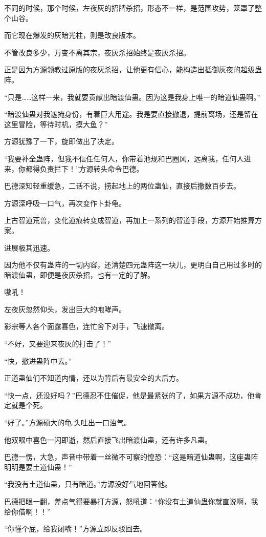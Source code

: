 \begin{this_body}
不同的时候，那个时候，左夜灰的招牌杀招，形态不一样，是范围攻势，笼罩了整个山谷。

而它现在爆发的灰暗光柱，则是改良版本。

不管改良多少，万变不离其宗，夜灰杀招始终是夜灰杀招。

正是因为方源领教过原版的夜灰杀招，让他更有信心，能构造出抵御灰夜的超级蛊阵。

“只是……这样一来，我就要贡献出暗渡仙蛊。因为这是我身上唯一的暗道仙蛊啊。”

“暗渡仙蛊对我遮掩身份，有着巨大用途。我是要直接撤退，提前离场，还是留在这里冒险，等待时机，摸大鱼？”

方源犹豫了一下，旋即做出了决定。

“我要补全蛊阵，但我不信任任何人，你带着池规和巴圈风，远离我，任何人进来，你都得负责拦下！”方源转头命令巴德。

巴德深知轻重缓急，二话不说，捞起地上的两位蛊仙，直接后撤数百步去。

方源深呼吸一口气，再次变作卜卦龟。

上古智道荒兽，变化道痕转变成智道，再加上一系列的智道手段，方源开始推算方案。

进展极其迅速。

因为他不仅有蛊阵的一切内容，还清楚四元蛊阵这一块儿，更明白自己用过多时的暗渡仙蛊，即便是夜灰杀招，也有一定的了解。

嗷吼！

左夜灰忽然仰头，发出巨大的咆哮声。

影宗等人各个面露喜色，连忙舍下对手，飞速撤离。

“不好，又要迎来夜灰的打击了！”

“快，撤进蛊阵中去。”

正道蛊仙们不知道内情，还以为背后有最安全的大后方。

“快一点，还没好吗？”巴德忍不住催促，他是最紧张的了，如果方源不成功，他肯定就是个死。

“好了。”方源硕大的龟.头吐出一口浊气。

他双眼中喜色一闪即逝，然后直接飞出暗渡仙蛊，还有许多凡蛊。

巴德一愣，大急，声音中带着一丝微不可察的惶恐：“这是暗道仙蛊啊，这座蛊阵明明是要土道仙蛊！”

“我没有土道仙蛊，只有暗道。”方源没好气地回答他。

巴德把眼一翻，差点气得要暴打方源，怒吼道：“你没有土道仙蛊你就直说啊，我给你借啊！！”

“你懂个屁，给我闭嘴！”方源立即反驳回去。


\end{this_body}
